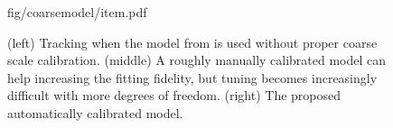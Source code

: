 \begin{figure}[b!]
\centering
\begin{overpic} 
[width=\linewidth]
{fig/coarsemodel/item.pdf}
\end{overpic}
\vspace{-.25in}
\caption{(left) Tracking when the model from \protect\cite{tagliasacchi2015robust} is used without proper coarse scale calibration. (middle) A roughly manually calibrated model can help increasing the fitting fidelity, but tuning becomes increasingly difficult with more degrees of freedom. (right) The proposed automatically calibrated model. }
\label{fig:coarsemodel}
\end{figure}